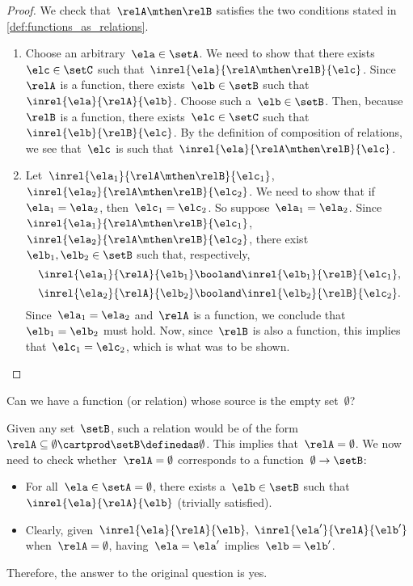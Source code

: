 \begin{proof}
    We check that~$\relA \mthen \relB$ satisfies the two conditions stated in \cref{def:functions_as_relations}.

    \begin{enumerate}
        \item Choose an arbitrary~$\ela \in \setA$.
              We need to show that there exists~$\elc \in \setC$ such that~$\inrel{\ela}{\relA \mthen \relB}{\elc}$.
              Since~$\relA$ is a function, there exists~$\elb \in \setB$ such that~$\inrel{\ela}{\relA}{\elb}$.
              Choose such a~$\elb \in \setB$.
              Then, because~$\relB$ is a function, there exists~$\elc \in \setC$ such that~$\inrel{\elb}{\relB}{\elc}$.
              By the definition of composition of relations, we see that~$\elc$ is such that~$\inrel{\ela}{\relA \mthen \relB}{\elc}$.
        \item Let~$\inrel{\ela_1}{\relA \mthen \relB}{\elc_1}$,~$\inrel{\ela_2}{\relA \mthen \relB}{\elc_2}$.
              We need to show that if~$\ela_1 = \ela_2$, then~$\elc_1 = \elc_2$.
              So suppose~$\ela_1 = \ela_2$.
              Since~$\inrel{\ela_1}{\relA \mthen \relB}{\elc_1}$,~$\inrel{\ela_2}{\relA \mthen \relB}{\elc_2}$, there exist~$\elb_1, \elb_2 \in \setB$ such that, respectively,
              \begin{equation*}
                  \inrel{\ela_1}{\relA}{\elb_1} \booland \inrel{\elb_1}{\relB}{\elc_1},
              \end{equation*}
              \begin{equation*}
                  \inrel{\ela_2}{\relA}{\elb_2} \booland \inrel{\elb_2}{\relB}{\elc_2}.
              \end{equation*}
              Since~$\ela_1 = \ela_2$ and~$\relA$ is a function, we conclude that~$\elb_1 = \elb_2$ must hold.
              Now, since~$\relB$ is also a function, this implies that~$\elc_1 = \elc_2$, which is what was to be shown.
    \end{enumerate}
\end{proof}

\begin{exercise}
    Can we have a function (or relation) whose source is the empty set~$\emptyset$?
\end{exercise}
\begin{solution}
    Given any set~$\setB$, such a relation would be of the form~$\relA \subseteq \emptyset \cartprod \setB \definedas \emptyset$.
    This implies that~$\relA=\emptyset$.
    We now need to check whether~$\relA=\emptyset$ corresponds to a function~$\emptyset\to \setB$:
    \begin{itemize}
        \item For all~$\ela\in \setA=\emptyset$, there exists a~$\elb \in \setB$ such that $\inrel{\ela}{\relA}{\elb}$ (trivially satisfied).
        \item Clearly, given~$\inrel{\ela}{\relA}{\elb},~\inrel{\ela'}{\relA}{\elb'}$ when~$\relA=\emptyset$, having~$\ela=\ela'$ implies~$\elb=\elb'$.
    \end{itemize}
    Therefore, the answer to the original question is yes.
\end{solution}

